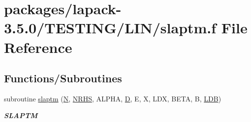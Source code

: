 \hypertarget{slaptm_8f}{}\section{packages/lapack-\/3.5.0/\+T\+E\+S\+T\+I\+N\+G/\+L\+I\+N/slaptm.f File Reference}
\label{slaptm_8f}
\subsection*{Functions/\+Subroutines}
\begin{DoxyCompactItemize}
\item 
subroutine \hyperlink{group__single__lin_gaf7fbe7842daa7c2a830c5a3245cc7d1a}{slaptm} (\hyperlink{polmisc_8c_a0240ac851181b84ac374872dc5434ee4}{N}, \hyperlink{example__user_8c_aa0138da002ce2a90360df2f521eb3198}{N\+R\+H\+S}, A\+L\+P\+H\+A, \hyperlink{odrpack_8h_a7dae6ea403d00f3687f24a874e67d139}{D}, E, X, L\+D\+X, B\+E\+T\+A, B, \hyperlink{example__user_8c_a50e90a7104df172b5a89a06c47fcca04}{L\+D\+B})
\begin{DoxyCompactList}\small\item\em {\bfseries S\+L\+A\+P\+T\+M} \end{DoxyCompactList}\end{DoxyCompactItemize}
